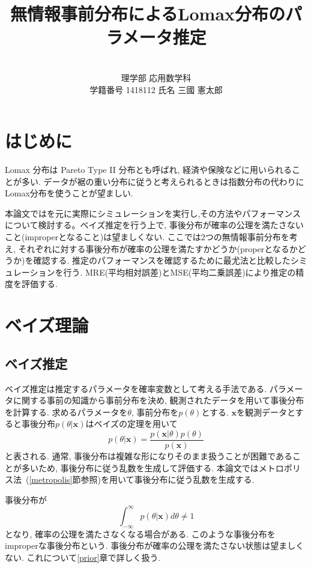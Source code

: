 \documentclass[titlepage,twoside]{jarticle}
\theoremstyle{definition}
\begin{document}
\title{{\Huge 無情報事前分布によるLomax分布のパラメータ推定}}
\author{\vspace*{50mm}\ \\理学部 応用数学科\\ 学籍番号 1418112 氏名 三國 憲太郎}
\date{}

\maketitle
\newpage
\tableofcontents
\newpage
\section{はじめに}

Lomax 分布は Pareto Type II 分布とも呼ばれ, 経済や保険などに用いられることが多い. データが裾の重い分布に従うと考えられるときは指数分布の代わりにLomax分布を使うことが望ましい.

本論文では\cite{Lomax2020}を元に実際にシミュレーションを実行し,その方法やパフォーマンスについて検討する。ベイズ推定を行う上で, 事後分布が確率の公理を満たさないこと(improperとなること)は望ましくない. ここでは$2$つの無情報事前分布を考え, それぞれに対する事後分布が確率の公理を満たすかどうか(properとなるかどうか)を確認する. 推定のパフォーマンスを確認するために最尤法と比較したシミュレーションを行う. MRE(平均相対誤差)とMSE(平均二乗誤差)により推定の精度を評価する.

\section{ベイズ理論}

\subsection{ベイズ推定}

ベイズ推定は推定するパラメータを確率変数として考える手法である. パラメータに関する事前の知識から事前分布を決め, 観測されたデータを用いて事後分布を計算する. 求めるパラメータを$\theta$, 事前分布を$p(\theta)$とする. $\bm{x}$を観測データとすると事後分布$p(\theta|\bm{x})$はベイズの定理を用いて
$$
p(\theta|\bm{x}) = \dfrac{p(\bm{x}|\theta)p(\theta)}{p(\bm{x})}
$$
と表される. 通常, 事後分布は複雑な形になりそのまま扱うことが困難であることが多いため, 事後分布に従う乱数を生成して評価する. 本論文ではメトロポリス法~(\ref{metropolis}節参照)を用いて事後分布に従う乱数を生成する.

事後分布が
$$
\int_{-\infty}^{\infty}p(\theta|\bm{x})d\theta \neq 1
$$
となり, 確率の公理を満たさなくなる場合がある. このような事後分布をimproperな事後分布という. 事後分布が確率の公理を満たさない状態は望ましくない. これについて\ref{prior}章で詳しく扱う. 
\end{document}

